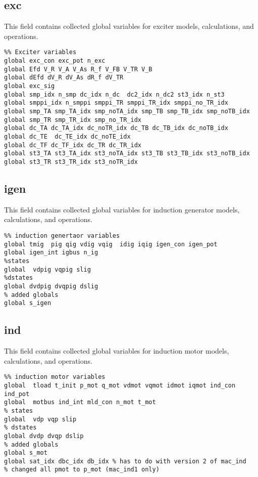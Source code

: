 \subsection{exc}
This field contains collected global variables for exciter models, calculations, and operations.
\begin{verbatim}
%% Exciter variables
global exc_con exc_pot n_exc
global Efd V_R V_A V_As R_f V_FB V_TR V_B
global dEfd dV_R dV_As dR_f dV_TR
global exc_sig 
global smp_idx n_smp dc_idx n_dc  dc2_idx n_dc2 st3_idx n_st3
global smppi_idx n_smppi smppi_TR smppi_TR_idx smppi_no_TR_idx 
global smp_TA smp_TA_idx smp_noTA_idx smp_TB smp_TB_idx smp_noTB_idx
global smp_TR smp_TR_idx smp_no_TR_idx 
global dc_TA dc_TA_idx dc_noTR_idx dc_TB dc_TB_idx dc_noTB_idx
global dc_TE  dc_TE_idx dc_noTE_idx
global dc_TF dc_TF_idx dc_TR dc_TR_idx
global st3_TA st3_TA_idx st3_noTA_idx st3_TB st3_TB_idx st3_noTB_idx
global st3_TR st3_TR_idx st3_noTR_idx
\end{verbatim}

\subsection{igen}
This field contains collected global variables for induction generator models, calculations, and operations.
\begin{verbatim}
%% induction genertaor variables 
global tmig  pig qig vdig vqig  idig iqig igen_con igen_pot
global igen_int igbus n_ig
%states
global  vdpig vqpig slig
%dstates
global dvdpig dvqpig dslig
% added globals
global s_igen
\end{verbatim}


\subsection{ind}
This field contains collected global variables for induction motor models, calculations, and operations.
\begin{verbatim}
%% induction motor variables
global  tload t_init p_mot q_mot vdmot vqmot idmot iqmot ind_con ind_pot
global  motbus ind_int mld_con n_mot t_mot
% states
global  vdp vqp slip
% dstates
global dvdp dvqp dslip
% added globals
global s_mot
global sat_idx dbc_idx db_idx % has to do with version 2 of mac_ind
% changed all pmot to p_mot (mac_ind1 only)
\end{verbatim}

